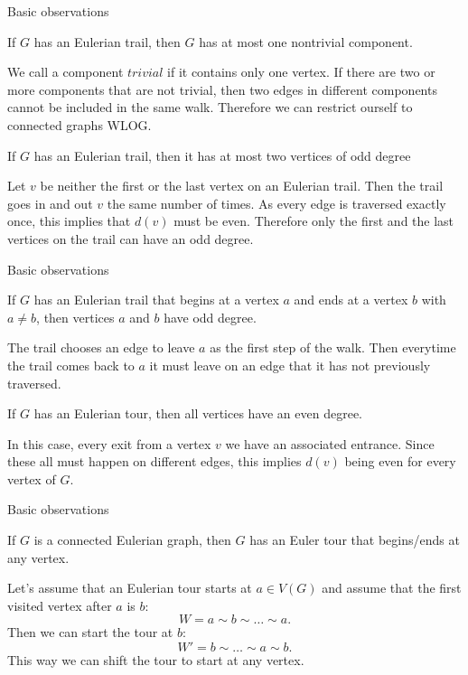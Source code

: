 \documentclass{beamer}
\def\bl[#1]#2{\begin{block}{#1}#2\end{block}}
\begin{document}
\begin{frame}{Basic observations}

\bl[]{If $G$ has an Eulerian trail, then $G$ has at most one nontrivial component.}\vspace{0.3cm}

We call a component $\textit{trivial}$ if it contains only one vertex. If there are two or more components that are not trivial, then two edges in different components cannot be included in the same walk. Therefore we can restrict ourself to connected graphs WLOG.

\bl[]{If $G$ has an Eulerian trail, then it has at most two vertices of odd degree}

Let $v$ be neither the first or the last vertex on an Eulerian trail. Then the trail goes in and out $v$ the same number of times. As every edge is traversed exactly once, this implies that $d(v)$ must be even. Therefore only the first and the last vertices on the trail can have an odd degree.

\end{frame}

\begin{frame}{Basic observations}

\bl[]{If $G$ has an Eulerian trail that begins at a vertex $a$ and ends at a vertex $b$ with $a\neq b$, then vertices $a$ and $b$ have odd degree.}
The trail chooses an edge to leave $a$ as the first step of the walk. Then everytime the trail comes back to $a$ it must leave on an edge that it has not previously traversed.

\bl[]{If $G$ has an Eulerian tour, then all vertices have an even degree.}
In this case, every exit from a vertex $v$ we have an associated entrance. Since these all must happen on different edges, this implies $d(v)$ being even for every vertex of $G$.

\end{frame}

\begin{frame}{Basic observations}

\bl[]{If $G$ is a connected Eulerian graph, then $G$ has an Euler tour that begins/ends at any vertex.}
Let's assume that an Eulerian tour starts at $a\in V(G)$ and assume that the first visited vertex after $a$ is $b$:
\[
W=a\sim b\sim\dots\sim a.
\]
Then we can start the tour at $b$:
\[
W'=b\sim\dots\sim a\sim b.
\]
This way we can shift the tour to start at any vertex.

\end{frame}
\end{document}
